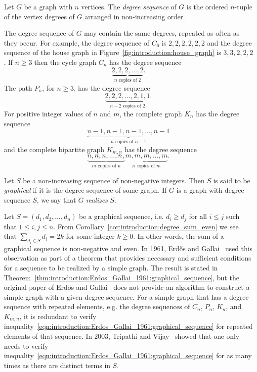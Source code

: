 Let $G$ be a graph with $n$ vertices. The
\emph{degree sequence} of $G$ is the ordered
$n$-tuple of the vertex degrees of $G$ arranged in non-increasing
order.

The degree sequence of $G$ may contain the same degrees, repeated as
often as they occur. For example, the degree sequence of $C_6$ is
$2, 2, 2, 2, 2, 2$ and the degree sequence of the house graph in
Figure~\ref{fig:introduction:house_graph} is $3, 3, 2, 2, 2$. If
$n \geq 3$ then the cycle graph $C_n$ has the degree sequence
\[
\underbrace{2, 2, 2, \dots, 2}_{n \text{ copies of } 2}.
\]
The path $P_n$, for $n \geq 3$, has the degree sequence
\[
\underbrace{2, 2, 2, \dots, 2, 1, 1}_{n - 2 \text{ copies of } 2}.
\]
For positive integer values of $n$ and $m$, the complete graph $K_n$
has the degree sequence
\[
\underbrace{n-1, n-1, n-1, \dots, n-1}_{n \text{ copies of } n-1}
\]
and the complete bipartite graph $K_{m,n}$ has the degree sequence
\[
\underbrace{n, n, n, \dots, n,}_{m \text{ copies of } n}
\underbrace{m, m, m, \dots, m}_{n \text{ copies of } m}.
\]

Let $S$ be a non-increasing sequence of non-negative integers. Then
$S$ is said to be \emph{graphical} if it is
the degree sequence of some graph. If $G$ is a graph with degree
sequence $S$, we say that $G$ \emph{realizes} $S$.


Let $S = (d_1, d_2, \dots, d_n)$ be a graphical sequence, i.e.
$d_i \geq d_j$ for all $i \leq j$ such that $1 \leq i, j \leq n$. From
Corollary~\ref{cor:introduction:degree_sum_even} we see that
$\sum_{d_i \in S} d_i = 2k$ for some integer $k \geq 0$. In other
words, the sum of a graphical sequence is non-negative and
even. In 1961, Erd\H{o}s and
Gallai~\cite{ErdosGallai1960} used this
observation as part of a theorem that provides necessary and
sufficient conditions for a sequence to be realized by a simple
graph. The result is stated in
Theorem~\ref{thm:introduction:Erdos_Gallai_1961:graphical_sequence},
but the original paper of Erd\H{o}s and Gallai~\cite{ErdosGallai1960}
does not provide an algorithm to construct a simple graph with a given
degree sequence. For a simple graph that has a degree sequence with
repeated elements, e.g. the degree sequences of $C_n$, $P_n$, $K_n$,
and $K_{m,n}$, it is redundant to verify
inequality~\eqref{eqn:introduction:Erdos_Gallai_1961:graphical_sequence}
for repeated elements of that sequence. In 2003,
Tripathi and
Vijay~\cite{TripathiVijay2003} showed that one
only needs to verify
inequality~\eqref{eqn:introduction:Erdos_Gallai_1961:graphical_sequence}
for as many times as there are distinct terms in $S$.

